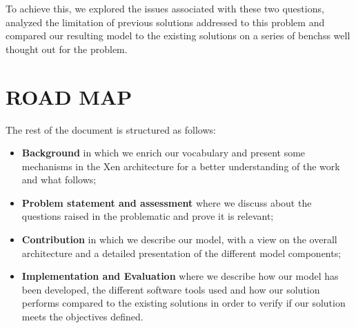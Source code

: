 To achieve this, we explored the issues associated with these two questions, analyzed the limitation of previous solutions addressed to this problem and compared our resulting model to the existing solutions on a series of \glspl{bench}s well thought out for the problem.

\section*{ROAD MAP}
The rest of the document is structured as follows: 

\begin{itemize}
    \item \textbf{Background} in which we enrich our vocabulary and present some mechanisms in the Xen architecture for a better understanding of the work and what follows;
    \item \textbf{Problem statement and assessment} where we discuss about the questions raised in the problematic and prove it is relevant;
    \item \textbf{Contribution} in which we describe our model, with a view on the overall architecture and a detailed presentation of the different model components;
    \item \textbf{Implementation and Evaluation} where we describe how our model has been developed, the different software tools used and how our solution performs compared to the existing solutions in order to verify if our solution meets the objectives defined.
\end{itemize} 

